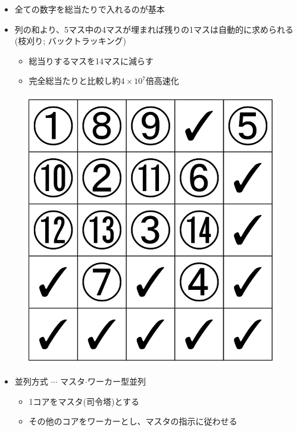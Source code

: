 \documentclass[a4paper,landscape,25pt]{foils}
\begin{document}
\begin{itemize}
\item 全ての数字を総当たりで入れるのが基本
\item 列の和より、5マス中の4マスが埋まれば残りの1マスは自動的に求められる(枝刈り; バックトラッキング)
\begin{itemize}
\item 総当りするマスを14マスに減らす
\item 完全総当たりと比較し約$4\times10^7$倍高速化
\end{itemize}
\end{itemize}
\newpage
\begin{figure}[htb]
\centering
\includegraphics[height=\textheight]{image2}
\end{figure}

\begin{itemize}
\item 並列方式 $\cdots$ マスタ$\cdot$ワーカー型並列
\begin{itemize}
\item 1コアをマスタ(司令塔)とする
\item その他のコアをワーカーとし、マスタの指示に従わせる
\end{itemize}
\end{itemize}
\end{document}
